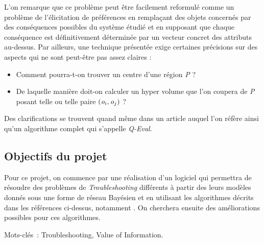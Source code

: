\documentclass[a4paper,11pt]{article}
\theoremstyle{plain}
\begin{document}
L’on remarque que ce problème peut être facilement reformulé comme un problème de l’élicitation de préférences en remplaçant des objets concernés par des conséquences possibles du système étudié et en supposant que chaque conséquence est définitivement déterminée par un vecteur concret des attributs au-dessus. Par ailleurs, une technique présentée exige certaines précisions sur des aspects qui ne sont peut-être pas assez claires :
\begin{itemize}
\item Comment pourra-t-on trouver un centre d’une région \emph{P} ?
\item De laquelle manière doit-on calculer un hyper volume que l’on coupera de \emph{P} posant telle ou telle paire $(\emph{o}_i, \emph{o}_j)$ ?
\end{itemize}
Des clarifications se trouvent quand même dans un article \cite{iyengar_q-eval_2001} auquel l’on réfère ainsi qu’un algorithme complet qui s’appelle \emph{Q-Eval}.

\subsection{Objectifs du projet}

Pour ce projet, on commence par une réalisation d'un logiciel qui permettra de résoudre des problèmes de \emph{Troubleshooting} différents à partir des leurs modèles donnés sous une forme de réseau Bayésien et en utilisant les algorithmes décrits dans les références ci-dessus, notamment \cite{Heckerman_1995, heckerman1994troubleshooting}. On cherchera ensuite des améliorations possibles pour ces algorithmes.

Mots-clés~: Troubleshooting, Value of Information.



\end{document}
